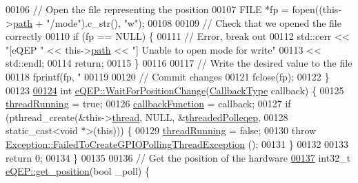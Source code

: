 \begin{DoxyCode}
{{00106   \textcolor{comment}{// Open the file representing the position}
00107   FILE *fp = fopen((this->\hyperlink{class_hardware_1_1e_q_e_p_a82718bc8478cde37f28fc685a859525e}{path} + \textcolor{stringliteral}{"/mode"}).c\_str(), \textcolor{stringliteral}{"w"});
00108 
00109   \textcolor{comment}{// Check that we opened the file correctly}
00110   \textcolor{keywordflow}{if} (fp == NULL) \{
00111     \textcolor{comment}{// Error, break out}
00112     std::cerr << \textcolor{stringliteral}{"[eQEP "} << this->\hyperlink{class_hardware_1_1e_q_e_p_a82718bc8478cde37f28fc685a859525e}{path} << \textcolor{stringliteral}{"] Unable to open mode for write"}
00113               << std::endl;
00114     \textcolor{keywordflow}{return};
00115   \}
00116 
00117   \textcolor{comment}{// Write the desired value to the file}
00118   fprintf(fp, \textcolor{stringliteral}{"%
00119 
00120   \textcolor{comment}{// Commit changes}
00121   fclose(fp);
00122 \}
00123 
\hypertarget{eqep_8cpp_source_l00124}{}\hyperlink{class_hardware_1_1e_q_e_p_a529f04118a9be4768c117c552ba34bd0}{00124} \textcolor{keywordtype}{int} \hyperlink{class_hardware_1_1e_q_e_p_a529f04118a9be4768c117c552ba34bd0}{eQEP::WaitForPositionChange}(\hyperlink{namespace_hardware_a5ba2e4bdfa2bbd8b551b1d5b2a0c61fd}{CallbackType} callback) \{
00125   \hyperlink{class_hardware_1_1_b_b_b_a0d9d8c56afb37955e0d0c6baf0f418df}{threadRunning} = \textcolor{keyword}{true};
00126   \hyperlink{class_hardware_1_1_b_b_b_a66d583952f3949a732ee15eea81e80e5}{callbackFunction} = callback;
00127   \textcolor{keywordflow}{if} (pthread\_create(&this->\hyperlink{class_hardware_1_1_b_b_b_a3ad3fe886705bfc242ef58dc5329166e}{thread}, NULL, &\hyperlink{class_hardware_1_1e_q_e_p_a0dd4c4778480f930ef697f898f2d4668}{threadedPolleqep},
00128                      static\_cast<void *>(\textcolor{keyword}{this}))) \{
00129     \hyperlink{class_hardware_1_1_b_b_b_a0d9d8c56afb37955e0d0c6baf0f418df}{threadRunning} = \textcolor{keyword}{false};
00130     \textcolor{keywordflow}{throw} \hyperlink{class_hardware_1_1_exception_1_1_failed_to_create_g_p_i_o_polling_thread_exception}{Exception::FailedToCreateGPIOPollingThreadException}
      ();
00131   \}
00132 
00133   \textcolor{keywordflow}{return} 0;
00134 \}
00135 
00136 \textcolor{comment}{// Get the position of the hardware}
\hypertarget{eqep_8cpp_source_l00137}{}\hyperlink{class_hardware_1_1e_q_e_p_a3b06e47e9bb9a559e81427fe3e4f7cf9}{00137} int32\_t \hyperlink{class_hardware_1_1e_q_e_p_a3b06e47e9bb9a559e81427fe3e4f7cf9}{eQEP::get\_position}(\textcolor{keywordtype}{bool} \_poll) \{
}}}
\end{DoxyCode}
